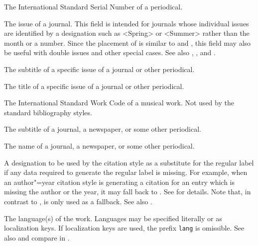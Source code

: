 \documentclass{ltxdockit}[2011/03/25]
\begin{document}
\begin{fieldlist}
The International Standard Serial Number of a periodical.


The issue of a journal. This field is intended for journals whose individual issues are identified by a designation such as <Spring> or <Summer> rather than the month or a number. Since the placement of  is similar to  and , this field may also be useful with double issues and other special cases. See also , , and .


The subtitle of a specific issue of a journal or other periodical.


The title of a specific issue of a journal or other periodical.


The International Standard Work Code of a musical work. Not used by the standard bibliography styles.


The subtitle of a journal, a newspaper, or some other periodical.


The name of a journal, a newspaper, or some other periodical.


A designation to be used by the citation style as a substitute for the regular label if any data required to generate the regular label is missing. For example, when an author"=year citation style is generating a citation for an entry which is missing the author or the year, it may fall back to . See  for details. Note that, in contrast to ,  is only used as a fallback. See also .


The language(s) of the work. Languages may be specified literally or as localization keys. If localization keys are used, the prefix \texttt{lang} is omissible. See also  and compare  in .



\end{fieldlist}
\end{document}
